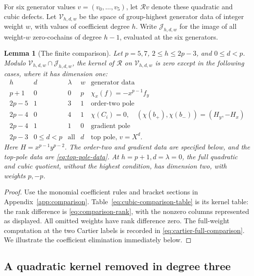 \documentclass[11pt]{article}
\theoremstyle{plain}
\newtheorem{lemma}[lemma]{Lemma}
\theoremstyle{definition}
\theoremstyle{remark}
\numberwithin{equation}{section}
\begin{document}
For six generator values \(v=(v_0,\ldots,v_5)\), let
\(\mathcal Rv\) denote these quadratic and cubic defects.
Let \(\mathcal V_{h,d,w}\) be the space of group-highest generator
data of integer weight \(w\), with values of coefficient degree \(h\).
Write \(\mathcal J_{h,d,w}\) for the image of all weight-\(w\)
zero-cochains of degree \(h-1\), evaluated at the six generators.

\begin{lemma}[The finite comparison]\label{lem:finite-comparison}
Let \(p=5,7\), \(2\le h\le2p-3\), and \(0\le d<p\).
Modulo \(\mathcal V_{h,d,w}\cap\mathcal J_{h,d,w}\), the kernel
of \(\mathcal R\) on \(\mathcal V_{h,d,w}\) is zero except in the
following cases, where it has dimension one:
\begin{equation}\label{eq:cubic-comparison-table}
\begin{array}{c|c|c|c|l}
 h&d&\lambda&w&\text{generator data}\\ \hline
 p+1&0&0&p&\chi_x(f)=-x^{p-1}f_y\\
 2p-5&1&3&1&\text{order-two pole}\\
 2p-4&0&4&1&\chi(C_i)=0,\quad(\chi(b_+),\chi(b_-))=(H_y,-H_x)\\
 2p-4&1&1&0&\text{gradient pole}\\
 2p-3&0\le d<p&\text{all}&d&\text{top pole, }v=X^d.
\end{array}
\end{equation}
Here \(H=x^{p-1}y^{p-2}\). The order-two and gradient data are
specified below, and the top-pole data are
\eqref{eq:top-pole-data}. At \(h=p+1,d=\lambda=0\), the full
quadratic and cubic quotient, without the highest condition, has
dimension two, with weights \(p,-p\).
\end{lemma}

\begin{proof}
Use the monomial coefficient rules and bracket sections in
Appendix~\ref{app:comparison}. Table~\eqref{eq:cubic-comparison-table}
is its kernel table: the rank difference is
\eqref{eq:comparison-rank}, with the nonzero columns represented as
displayed. All omitted weights have rank difference zero.
The full-weight computation at the two Cartier labels is recorded
in \eqref{eq:cartier-full-comparison}.
We illustrate the coefficient elimination immediately below.
\end{proof}

\subsection{A quadratic kernel removed in degree three}
\end{document}
